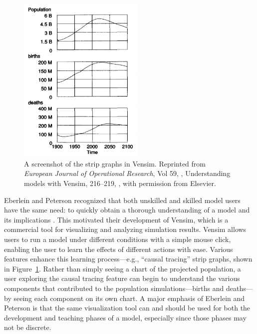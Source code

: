 \begin{figure}[h]
	\centering
	\includegraphics[width=6cm]{figures/png/vensim.png}
	\caption[A screenshot of the strip graphs in Vensim]{A screenshot of the strip graphs in Vensim.  Reprinted from \textit{European Journal of Operational Research}, Vol 59, \citeauthor{eberlein1992}, Understanding models with Vensim\texttrademark, 216--219, \textcopyright  \citeyear{eberlein1992}, with permission from Elsevier.}
	\label{fig:vensim}
\end{figure}

Eberlein and Peterson recognized that both unskilled and skilled model users have the same need: to quickly obtain a thorough understanding of a model and its implications \citeyearpar{eberlein1992}.  This motivated their development of Vensim, which is a commercial tool for visualizing and analyzing simulation results.  Vensim allows users to run a model under different conditions with a simple mouse click, enabling the user to learn the effects of different actions with ease.  Various features enhance this learning process---e.g., ``causal tracing'' strip graphs, shown in Figure~\ref{fig:vensim}.  Rather than simply seeing a chart of the projected population, a user exploring the causal tracing feature can begin to understand the various components that contributed to the population simulations---births and deaths---by seeing each component on its own chart.  A major emphasis of Eberlein and Peterson is that the same visualization tool can and should be used for both the development and teaching phases of a model, especially since those phases may not be discrete.
